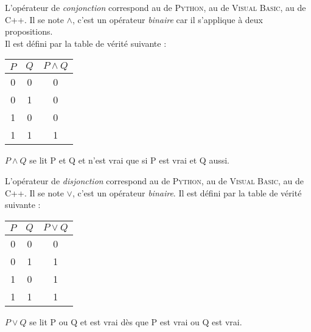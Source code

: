\documentclass[a4paper,12pt,french]{book}
\begin{document}
	\begin{definition}
	L'opérateur de \textit{conjonction} correspond au  de \textsc{Python}, au  de \textsc{Visual Basic}, au \tw{\&\&} de \textsc{C++}.
	Il se note $\wedge$, c'est un opérateur \textit{binaire} car il s'applique à deux propositions.\\
	Il est défini par la table de vérité suivante : 
	\begin{center}
		\begin{tabular}{|c|c|c|}
			\hline
			\rowcolor{lightgray}
			$P$ & $Q$ & $P\wedge Q$\\ 
			\hline 
			\rowcolor{white}
			0 & 0 & 0\\ 
			\hline
			\rowcolor{white}
			0 & 1 & 0\\ 
			\hline
			\rowcolor{white}
			1 & 0 & 0\\ 
			\hline\rowcolor{white}
			1 & 1 & 1\\ 
			\hline
		\end{tabular} 
	\end{center}
	$P\wedge Q$ se lit \og P et Q\fg{} et n'est vrai que si P est vrai et Q aussi.
	\end{definition}	

	\begin{definition}
	L'opérateur de \textit{disjonction} correspond au  de \textsc{Python}, au  de \textsc{Visual Basic}, au \tw{||} de \textsc{C++}.
	Il se note $\vee$, c'est un opérateur \textit{binaire}.	Il est défini par la table de vérité suivante : 
	\begin{center}
		\begin{tabular}{|c|c|c|}
			\hline
			\rowcolor{lightgray}
			$P$ & $Q$ & $P\vee Q$\\ 
			\hline 
			\rowcolor{white}
			0 & 0 & 0\\ 
			\hline
			\rowcolor{white}
			0 & 1 & 1\\ 
			\hline
			\rowcolor{white}
			1 & 0 & 1\\ 
			\hline\rowcolor{white}
			1 & 1 & 1\\ 
			\hline
		\end{tabular} 
	\end{center}
	$P\vee Q$ se lit \og P ou Q\fg{} et est vrai dès que P est vrai ou Q est vrai.
\end{definition}
\end{document}
